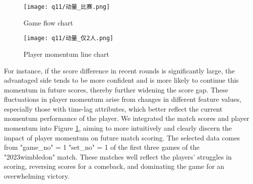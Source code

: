 \documentclass{mcmthesis}
\begin{document}
\begin{figure}[h]
    \centering
    \begin{minipage}{0.5\textwidth}
        \centering
        \texttt{[image: q11/动量\_比赛.png]} %
        \caption{Game flow chart}
        \label{fig_q11_1}
    \end{minipage}\hfill
    \begin{minipage}{0.5\textwidth}
        \centering
        \texttt{[image: q11/动量\_仅2人.png]}
        \caption{Player momentum line chart}
        \label{fig_q11_2}
    \end{minipage}
\end{figure}



For instance, if the score difference in recent rounds is significantly large, the advantaged side tends to be more confident and is more likely to continue this momentum in future scores, thereby further widening the score gap. These fluctuations in player momentum arise from changes in different feature values, especially those with time-lag attributes, which better reflect the current momentum performance of the player. We integrated the match scores and player momentum into Figure \ref{fig_q11_2}, aiming to more intuitively and clearly discern the impact of player momentum on future match scoring. The selected data comes from "game\_no" = 1 "set\_no" = 1 of the first three games of the "2023\-wimbledon" match. These matches well reflect the players' struggles in scoring, reversing scores for a comeback, and dominating the game for an overwhelming victory.
\end{document}
